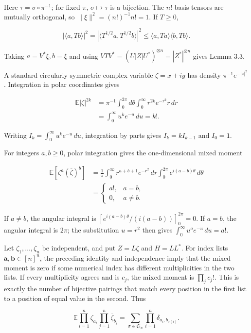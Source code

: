 \documentclass[11pt,a4paper]{article}
\begin{document}
Here \(\tau=\sigma\circ\pi^{-1}\); for fixed \(\pi\), \(\sigma\mapsto\tau\) is a bijection. The \(n!\) basis tensors are mutually orthogonal, so \(\|\xi\|^2=(n!)^{-1}n!=1\). If \(T\ge0\),

\[
|\langle a,Tb\rangle|^2
=|\langle T^{1/2}a,T^{1/2}b\rangle|^2
\le\langle a,Ta\rangle\langle b,Tb\rangle.
\]

Taking \(a=V^*\xi,b=\xi\) and using \(VTV^*=(U|Z|U^*)^{\otimes n}=|Z^*|^{\otimes n}\) gives Lemma 3.3.

A standard circularly symmetric complex variable \(\zeta=x+iy\) has density \(\pi^{-1}e^{-|z|^2}\). Integration in polar coordinates gives

\[
\begin{aligned}
\mathbb E|\zeta|^{2k}
&=\pi^{-1}\int_0^{2\pi}\!d\theta\int_0^{\infty}r^{2k}e^{-r^2}r\,dr\\
&=\int_0^{\infty}u^ke^{-u}\,du=k!.
\end{aligned}
\]

Writing \(I_k=\int_0^\infty u^ke^{-u}\,du\), integration by parts gives \(I_k=kI_{k-1}\) and \(I_0=1\).

For integers \(a,b\ge0\), polar integration gives the one-dimensional mixed moment

\[
\begin{aligned}
\mathbb E[\zeta^a(\overline\zeta)^b]
&=\frac1\pi\int_0^\infty r^{a+b+1}e^{-r^2}\,dr
\int_0^{2\pi}e^{i(a-b)\theta}\,d\theta\\
&=\begin{cases}a!,&a=b,\\0,&a\ne b.\end{cases}
\end{aligned}
\]

If \(a\ne b\), the angular integral is \([e^{i(a-b)\theta}/(i(a-b))]_0^{2\pi}=0\). If \(a=b\), the angular integral is \(2\pi\); the substitution \(u=r^2\) then gives \(\int_0^\infty u^ae^{-u}\,du=a!\).

Let \(\zeta_1,\ldots,\zeta_n\) be independent, and put \(Z=L\zeta\) and \(H=LL^*\). For index lists \(\boldsymbol a,\boldsymbol b\in[n]^n\), the preceding identity and independence imply that the mixed moment is zero if some numerical index has different multiplicities in the two lists. If every multiplicity agrees and is \(c_j\), the mixed moment is \(\prod_jc_j!\). This is exactly the number of bijective pairings that match every position in the first list to a position of equal value in the second. Thus

\[
\mathbb E\prod_{i=1}^n\zeta_{a_i}\prod_{j=1}^n\overline\zeta_{b_j}
=\sum_{\sigma\in \mathfrak S_n}\prod_{i=1}^n\delta_{a_i,b_{\sigma(i)}}.
\]
\end{document}
